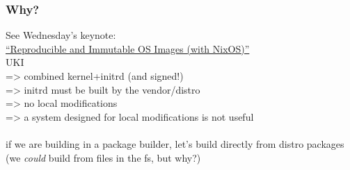 \documentclass[]{beamer}
\newcommand\pp{}
\begin{document}
\begin{frame}
  \frametitle{Why?}

  \pp

  See Wednesday's keynote:\\
  \href{https://cfp.all-systems-go.io/all-systems-go-2024/talk/MRDURE/}
       {``Reproducible and Immutable OS Images\pp{} (with NixOS)''}
  \\\pp

  UKI
  \\\pp
  => combined kernel+initrd (and signed!)
  \\\pp
  => initrd must be built by the vendor/distro
  \\\pp
  => no local modifications
  \\\pp
  => a system designed for local modifications is not useful
  \\\quad
  \\\pp

  if we are building in a package builder, let's build directly from distro packages\\
    (we \textit{could} build from files in the fs, but why?)
\end{frame}
\end{document}
